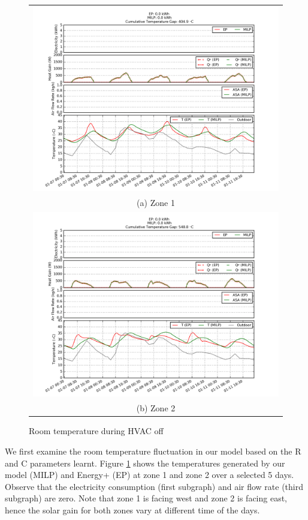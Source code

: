 \begin{figure} [h]
\vspace*{-2ex}
\centering
\begin{tabular}{c}
  \includegraphics[width=0.65\linewidth]{figs/app_2R_hvac_off_D7-12_2R_R0.png} \\
(a) Zone 1 \\[2pt]
  \includegraphics[width=0.65\linewidth]{figs/app_2R_hvac_off_D7-12_2R_R1.png} \\
(b) Zone 2 \\[2pt]
\end{tabular}
\vspace*{-2ex}
\caption{Room temperature during HVAC off}
\label{fig:compare_rt}
\vspace*{-2ex}
\end{figure}

We first examine the room temperature fluctuation in our model based on the R and C parameters learnt. Figure \ref{fig:compare_rt} shows the temperatures generated by our model (MILP) and Energy+ (EP) at zone 1 and zone 2 over a selected 5 days. Observe that the electricity consumption (first subgraph) and air flow rate (third subgraph) are zero. Note that zone 1 is facing west and zone 2 is facing east, hence the solar gain for both zones vary at different time of the days. 

